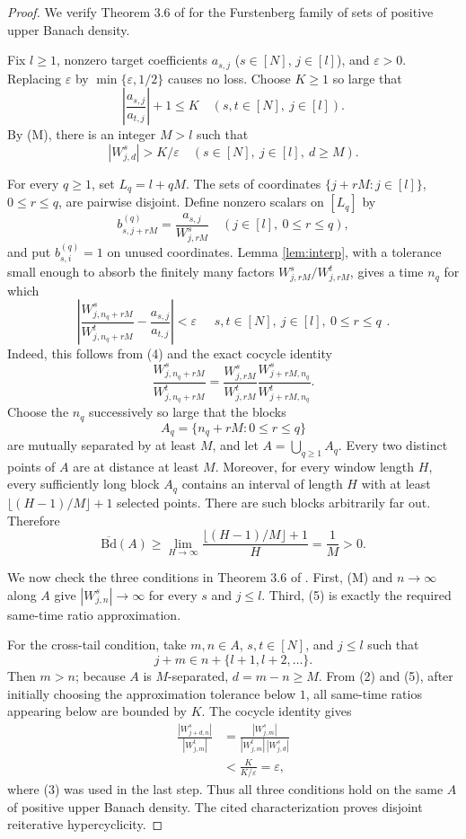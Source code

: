 \documentclass[11pt]{article}
\newcommand{\Bd}{\overline{\mathrm{Bd}}}
\begin{document}
\begin{proof}
We verify Theorem 3.6 of \cite{MMP} for the Furstenberg family of sets of
positive upper Banach density.

Fix $l\geq1$, nonzero target coefficients
$a_{s,j}$ ($s\in[N]$, $j\in[l]$), and $\varepsilon>0$.  Replacing
$\varepsilon$ by $\min\{\varepsilon,1/2\}$ causes no loss.  Choose $K\geq1$
so large that
\[
 \left|\frac{a_{s,j}}{a_{t,j}}\right|+1\leq K
 \quad(s,t\in[N],\ j\in[l]).                               \tag{2}
\]
By (M), there is an integer $M>l$ such that
\[
 |W^s_{j,d}|>K/\varepsilon
 \quad(s\in[N],\ j\in[l],\ d\geq M).                     \tag{3}
\]

For every $q\geq1$, set $L_q=l+qM$.  The sets of coordinates
$\{j+rM:j\in[l]\}$, $0\leq r\leq q$, are pairwise disjoint.  Define
nonzero scalars on $[L_q]$ by
\[
 b^{(q)}_{s,j+rM}=\frac{a_{s,j}}{W^s_{j,rM}}
 \quad(j\in[l],\ 0\leq r\leq q),                         \tag{4}
\]
and put $b^{(q)}_{s,i}=1$ on unused coordinates.  Lemma
\ref{lem:interp}, with a tolerance small enough to absorb the finitely many
factors $W^s_{j,rM}/W^t_{j,rM}$, gives a time $n_q$ for which
\[
 \left|\frac{W^s_{j,n_q+rM}}{W^t_{j,n_q+rM}}-
             \frac{a_{s,j}}{a_{t,j}}\right|<\varepsilon
 \quad\substack{s,t\in[N],\ j\in[l],\ 0\leq r\leq q}.   \tag{5}
\]
Indeed, this follows from (4) and the exact cocycle identity
\[
 \frac{W^s_{j,n_q+rM}}{W^t_{j,n_q+rM}}
 =\frac{W^s_{j,rM}}{W^t_{j,rM}}
  \frac{W^s_{j+rM,n_q}}{W^t_{j+rM,n_q}}.                   \tag{6}
\]
Choose the $n_q$ successively so large that the blocks
\[
 A_q=\{n_q+rM:0\leq r\leq q\}
\]
are mutually separated by at least $M$, and let $A=\bigcup_{q\geq1}A_q$.
Every two distinct points of $A$ are at distance at least $M$.  Moreover,
for every window length $H$, every sufficiently long block $A_q$ contains
an interval of length $H$ with at least
$\lfloor(H-1)/M\rfloor+1$ selected points.  There are such blocks arbitrarily
far out.  Therefore
\[
 \Bd(A)\geq\lim_{H\to\infty}
 \frac{\lfloor(H-1)/M\rfloor+1}{H}=\frac1M>0.               \tag{7}
\]

We now check the three conditions in Theorem 3.6 of \cite{MMP}.  First,
(M) and $n\to\infty$ along $A$ give
$|W^s_{j,n}|\to\infty$ for every $s$ and $j\leq l$.  Third, (5) is exactly
the required same-time ratio approximation.

For the cross-tail condition, take $m,n\in A$, $s,t\in[N]$, and $j\leq l$
such that
\[
 j+m\in n+\{l+1,l+2,\ldots\}.
\]
Then $m>n$; because $A$ is $M$-separated, $d=m-n\geq M$.  From (2) and
(5), after initially choosing the approximation tolerance below $1$, all
same-time ratios appearing below are bounded by $K$.  The cocycle identity
gives
\begin{align*}
 \frac{|W^s_{j+d,n}|}{|W^t_{j,m}|}
 &=\frac{|W^s_{j,m}|}{|W^t_{j,m}|\,|W^s_{j,d}|}\\
 &<\frac{K}{K/\varepsilon}=\varepsilon,                    \tag{8}
\end{align*}
where (3) was used in the last step.  Thus all three conditions hold on the
same $A$ of positive upper Banach density.  The cited characterization
proves disjoint reiterative hypercyclicity.
\end{proof}
\end{document}
